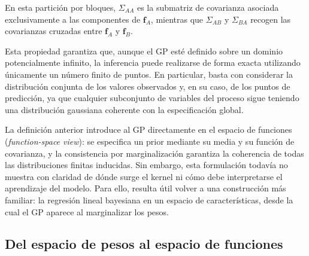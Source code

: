 En esta partición por bloques, $\Sigma_{AA}$ es la submatriz de covarianza asociada
exclusivamente a las componentes de $\mathbf{f}_A$, mientras que $\Sigma_{AB}$ y
$\Sigma_{BA}$ recogen las covarianzas cruzadas entre $\mathbf{f}_A$ y $\mathbf{f}_B$.

Esta propiedad garantiza que, aunque el GP esté definido sobre un dominio
potencialmente infinito, la inferencia puede realizarse de forma exacta utilizando únicamente
un número finito de puntos. En particular, basta con considerar la distribución conjunta de
los valores observados y, en su caso, de los puntos de predicción, ya que cualquier
subconjunto de variables del proceso sigue teniendo una distribución gaussiana coherente con
la especificación global.

La definición anterior introduce al GP directamente en el espacio de funciones (\emph{function-space view}): se especifica
un prior mediante su media y su función de covarianza, y la consistencia por marginalización
garantiza la coherencia de todas las distribuciones finitas inducidas. Sin embargo, esta
formulación todavía no muestra con claridad de dónde surge el kernel ni cómo debe
interpretarse el aprendizaje del modelo. Para ello, resulta útil volver a una construcción más
familiar: la regresión lineal bayesiana en un espacio de características, desde la cual el GP
aparece al marginalizar los pesos.

\subsection{Del espacio de pesos al espacio de funciones}

